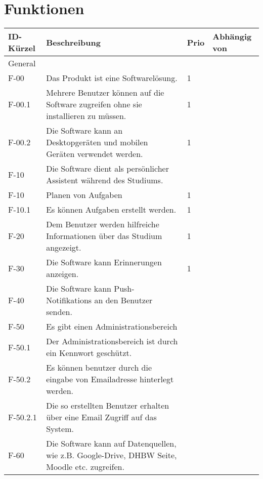 \chapter{Funktionen}


\begin{table}[H]
    \label{Funktionen::main}
    \begin{tabularx}{\textwidth}{|l|X|l|l|}
        \toprule
        \textbf{ID-Kürzel} & \textbf{Beschreibung} & \textbf{Prio} & \textbf{Abhängig von} \\
        \endhead
        \hline
        \multicolumn{4}{|l|}{General}\\
        \hline
        F-00 & Das Produkt ist eine Softwarelösung. & 1 & \\
        F-00.1 & Mehrere Benutzer können auf die Software zugreifen ohne sie installieren zu müssen. & 1 & \\
        F-00.2 & Die Software kann an Desktopgeräten und mobilen Geräten verwendet werden. & 1 & \\
        \hline
        F-10 & Die Software dient als persönlicher Assistent während des Studiums. & & \\
        F-10 & Planen von Aufgaben & 1 & \\
        F-10.1 & Es können Aufgaben erstellt werden. & 1 & \\

        F-20 & Dem Benutzer werden hilfreiche Informationen über das Studium angezeigt. & 1 & \\

        F-30 & Die Software kann Erinnerungen anzeigen. & 1 & \\

        F-40 & Die Software kann Push-Notifikations an den Benutzer senden. & & \\

        F-50 & Es gibt einen Administrationsbereich & & \\
        F-50.1 & Der Administrationsbereich ist durch ein Kennwort geschützt. & & \\ %
        F-50.2 & Es können benutzer durch die eingabe von Emailadresse hinterlegt werden. & & \\
        F-50.2.1 & Die so erstellten Benutzer erhalten über eine Email Zugriff auf das System. & & \\ %
        
        F-60 & Die Software kann auf Datenquellen, wie z.B. Google-Drive, DHBW Seite, Moodle etc. zugreifen. & & \\


\end{tabularx}
\end{table}
